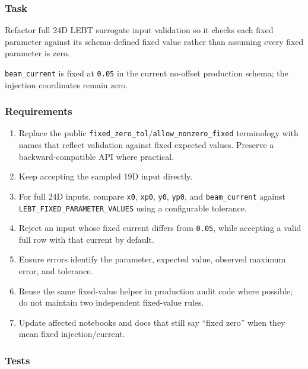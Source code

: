 \documentclass[
]{article}
\providecommand{\tightlist}{%
  \setlength{\itemsep}{0pt}\setlength{\parskip}{0pt}}
\begin{document}
\hypertarget{task}{%
\subsubsection{Task}\label{task}}

Refactor full 24D LEBT surrogate input validation so it checks each
fixed parameter against its schema-defined fixed value rather than
assuming every fixed parameter is zero.

\texttt{beam\_current} is fixed at \texttt{0.05} in the current
no-offset production schema; the injection coordinates remain zero.

\hypertarget{requirements}{%
\subsubsection{Requirements}\label{requirements}}

\begin{enumerate}
\def\labelenumi{\arabic{enumi}.}
\tightlist
\item
  Replace the public
  \texttt{fixed\_zero\_tol}/\texttt{allow\_nonzero\_fixed} terminology
  with names that reflect validation against fixed expected values.
  Preserve a backward-compatible API where practical.
\item
  Keep accepting the sampled 19D input directly.
\item
  For full 24D inputs, compare \texttt{x0}, \texttt{xp0}, \texttt{y0},
  \texttt{yp0}, and \texttt{beam\_current} against
  \texttt{LEBT\_FIXED\_PARAMETER\_VALUES} using a configurable
  tolerance.
\item
  Reject an input whose fixed current differs from \texttt{0.05}, while
  accepting a valid full row with that current by default.
\item
  Ensure errors identify the parameter, expected value, observed maximum
  error, and tolerance.
\item
  Reuse the same fixed-value helper in production audit code where
  possible; do not maintain two independent fixed-value rules.
\item
  Update affected notebooks and docs that still say ``fixed zero'' when
  they mean fixed injection/current.
\end{enumerate}

\hypertarget{tests}{%
\subsubsection{Tests}\label{tests}}
\end{document}
